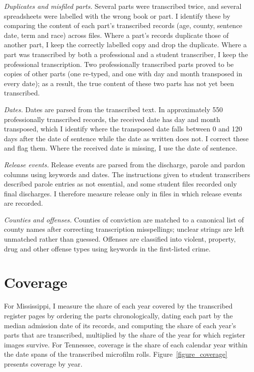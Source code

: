 \documentclass[12pt]{article}
\begin{document}
\emph{Duplicates and misfiled parts.}  Several parts were transcribed twice, and several spreadsheets were labelled with the wrong book or part.  I identify these by comparing the content of each part's transcribed records (age, county, sentence date, term and race) across files.  Where a part's records duplicate those of another part, I keep the correctly labelled copy and drop the duplicate.  Where a part was transcribed by both a professional and a student transcriber, I keep the professional transcription.  Two professionally transcribed parts proved to be copies of other parts (one re-typed, and one with day and month transposed in every date); as a result, the true content of these two parts has not yet been transcribed.

\emph{Dates.}  Dates are parsed from the transcribed text.  In approximately 550 professionally transcribed records, the received date has day and month transposed, which I identify where the transposed date falls between 0 and 120 days after the date of sentence while the date as written does not.  I correct these and flag them.  Where the received date is missing, I use the date of sentence.

\emph{Release events.}  Release events are parsed from the discharge, parole and pardon columns using keywords and dates.  The instructions given to student transcribers described parole entries as not essential, and some student files recorded only final discharges.  I therefore measure release only in files in which release events are recorded.

\emph{Counties and offenses.}  Counties of conviction are matched to a canonical list of county names after correcting transcription misspellings; unclear strings are left unmatched rather than guessed.  Offenses are classified into violent, property, drug and other offense types using keywords in the first-listed crime.



\section{Coverage}\label{appendix_coverage}

\noindent For Mississippi, I measure the share of each year covered by the transcribed register pages by ordering the parts chronologically, dating each part by the median admission date of its records, and computing the share of each year's parts that are transcribed, multiplied by the share of the year for which register images survive.  For Tennessee, coverage is the share of each calendar year within the date spans of the transcribed microfilm rolls.  Figure~\ref{figure_coverage} presents coverage by year.
\end{document}

